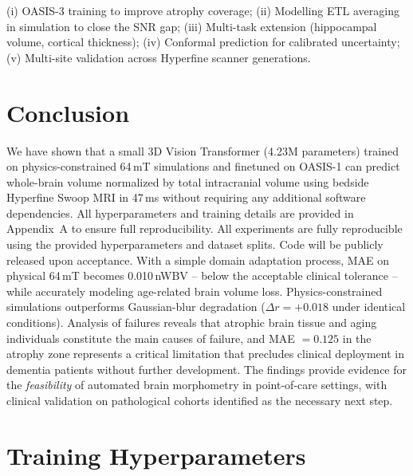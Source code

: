 \documentclass{ieeeaccess}
\begin{document}
(i) OASIS-3 training to improve atrophy coverage;
(ii) Modelling ETL averaging in simulation to close the SNR gap;
(iii) Multi-task extension (hippocampal volume, cortical thickness);
(iv) Conformal prediction for calibrated uncertainty;
(v) Multi-site validation across Hyperfine scanner generations.

\section{Conclusion}
\label{sec:conclusion}

We have shown that a small 3D Vision Transformer (4.23M parameters) trained
on physics-constrained 64\,mT simulations and finetuned on OASIS-1 can
predict whole-brain volume normalized by total intracranial volume using
bedside Hyperfine Swoop MRI in 47\,ms without requiring any additional
software dependencies. All hyperparameters and training details are provided
in Appendix~A to ensure full reproducibility.
All experiments are fully reproducible using the provided hyperparameters
and dataset splits. Code will be publicly released upon acceptance. With a simple domain
adaptation process, MAE on
physical 64\,mT becomes 0.010\,nWBV -- below the acceptable clinical
tolerance -- while accurately modeling age-related brain volume loss.
Physics-constrained simulations outperforms Gaussian-blur degradation
($\Delta r = +0.018$ under identical conditions).
Analysis of failures reveals that atrophic brain tissue and aging individuals
constitute the main causes of failure, and MAE $= 0.125$ in the atrophy zone
represents a critical limitation that precludes clinical deployment in
dementia patients without further development. The findings provide evidence
for the \emph{feasibility} of automated brain morphometry in point-of-care
settings, with clinical validation on pathological cohorts identified as the
necessary next step.

\clearpage

\appendices
\section{Training Hyperparameters}
\label{app:hyperparams}
\end{document}
